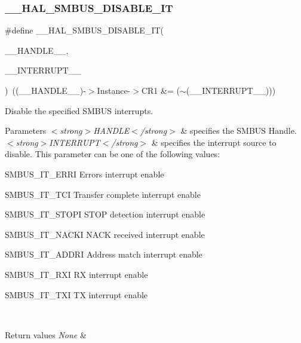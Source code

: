\subsubsection{\texorpdfstring{\+\_\+\+\_\+\+H\+A\+L\+\_\+\+S\+M\+B\+U\+S\+\_\+\+D\+I\+S\+A\+B\+L\+E\+\_\+\+IT}{\_\_HAL\_SMBUS\_DISABLE\_IT}}
{\footnotesize\ttfamily \#define \+\_\+\+\_\+\+H\+A\+L\+\_\+\+S\+M\+B\+U\+S\+\_\+\+D\+I\+S\+A\+B\+L\+E\+\_\+\+IT(\begin{DoxyParamCaption}\item[{}]{\+\_\+\+\_\+\+H\+A\+N\+D\+L\+E\+\_\+\+\_\+,  }\item[{}]{\+\_\+\+\_\+\+I\+N\+T\+E\+R\+R\+U\+P\+T\+\_\+\+\_\+ }\end{DoxyParamCaption})~((\+\_\+\+\_\+\+H\+A\+N\+D\+L\+E\+\_\+\+\_\+)-\/$>$Instance-\/$>$C\+R1 \&= ($\sim$(\+\_\+\+\_\+\+I\+N\+T\+E\+R\+R\+U\+P\+T\+\_\+\+\_\+)))}



Disable the specified S\+M\+B\+US interrupts. 


\begin{DoxyParams}{Parameters}
{\em $<$strong$>$\+H\+A\+N\+D\+L\+E$<$/strong$>$} & specifies the S\+M\+B\+US Handle. \\
\hline
{\em $<$strong$>$\+I\+N\+T\+E\+R\+R\+U\+P\+T$<$/strong$>$} & specifies the interrupt source to disable. This parameter can be one of the following values\+: \begin{DoxyItemize}
\item S\+M\+B\+U\+S\+\_\+\+I\+T\+\_\+\+E\+R\+RI Errors interrupt enable \item S\+M\+B\+U\+S\+\_\+\+I\+T\+\_\+\+T\+CI Transfer complete interrupt enable \item S\+M\+B\+U\+S\+\_\+\+I\+T\+\_\+\+S\+T\+O\+PI S\+T\+OP detection interrupt enable \item S\+M\+B\+U\+S\+\_\+\+I\+T\+\_\+\+N\+A\+C\+KI N\+A\+CK received interrupt enable \item S\+M\+B\+U\+S\+\_\+\+I\+T\+\_\+\+A\+D\+D\+RI Address match interrupt enable \item S\+M\+B\+U\+S\+\_\+\+I\+T\+\_\+\+R\+XI RX interrupt enable \item S\+M\+B\+U\+S\+\_\+\+I\+T\+\_\+\+T\+XI TX interrupt enable\end{DoxyItemize}
\\
\hline
\end{DoxyParams}

\begin{DoxyRetVals}{Return values}
{\em None} & \\
\hline
\end{DoxyRetVals}
\mbox{\label{group___s_m_b_u_s___exported___macros_gab33be047be5d261b7a54dc7b11dd49ae}} 
